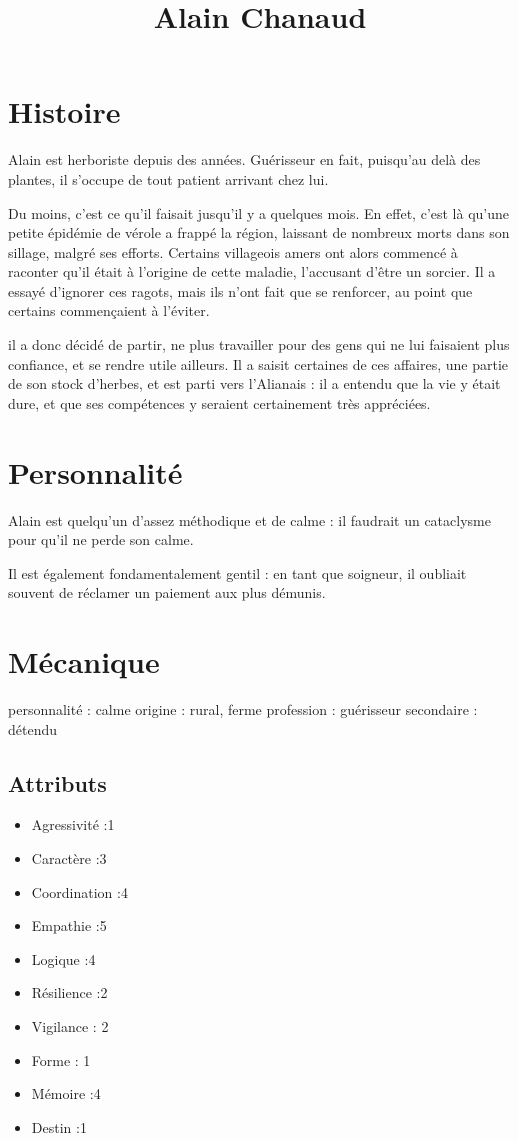 \documentclass[10pt,a4paper]{article}
\title{Alain Chanaud}
\date{}
\begin{document}
\maketitle
\section{Histoire}
Alain est herboriste depuis des années. Guérisseur en fait, puisqu'au delà des plantes, il s'occupe de tout patient arrivant chez lui.

Du moins, c'est ce qu'il faisait jusqu'il y a quelques mois. En effet, c'est là qu'une petite épidémie de vérole a frappé la région, laissant de nombreux morts dans son sillage, malgré ses efforts. Certains villageois amers ont alors commencé à raconter qu'il était à l'origine de cette maladie, l'accusant d'être un sorcier. Il a essayé d'ignorer ces ragots, mais ils n'ont fait que se renforcer, au point que certains commençaient à l'éviter.

il a donc décidé de partir, ne plus travailler pour des gens qui ne lui faisaient plus confiance, et se rendre utile ailleurs. Il a saisit certaines de ces affaires, une partie de son stock d'herbes, et est parti vers l'Alianais : il a entendu que la vie y était dure, et que ses compétences y seraient certainement très appréciées.
\section{Personnalité}
Alain est quelqu'un d'assez méthodique et de calme : il faudrait un cataclysme pour qu'il ne perde son calme.

Il est également fondamentalement gentil : en tant que soigneur, il oubliait souvent de réclamer un paiement aux plus démunis.
\section{Mécanique}
personnalité : calme
origine : rural, ferme
profession : guérisseur
secondaire : détendu
\subsection{Attributs}
\begin{itemize}
\item Agressivité :1
\item Caractère :3
\item Coordination :4
\item Empathie :5
\item Logique :4
\item Résilience :2
\item Vigilance : 2
\item Forme : 1
\item Mémoire :4
\item Destin :1
\end{itemize}
\end{document}
